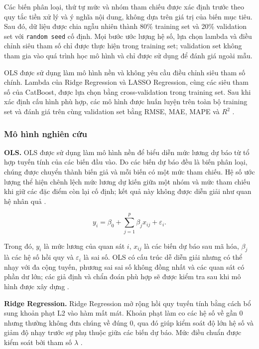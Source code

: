 Các biến phân loại, thứ tự mức và nhóm tham chiếu được xác định trước
theo quy tắc tiền xử lý và ý nghĩa nội dung, không dựa trên giá trị của
biến mục tiêu. Sau đó, dữ liệu được chia ngẫu nhiên thành 80\% training
set và 20\% validation set với \texttt{random\ seed} cố định. Mọi bước
ước lượng hệ số, lựa chọn lambda và điều chỉnh siêu tham số chỉ được
thực hiện trong training set; validation set không tham gia vào quá
trình học mô hình và chỉ được sử dụng để đánh giá ngoài mẫu.

OLS được sử dụng làm mô hình nền và không yêu cầu điều chỉnh siêu tham
số chính. Lambda của Ridge Regression và LASSO Regression, cùng các siêu
tham số của CatBoost, được lựa chọn bằng cross-validation trong training
set. Sau khi xác định cấu hình phù hợp, các mô hình được huấn luyện trên
toàn bộ training set và đánh giá trên cùng validation set bằng RMSE,
MAE, MAPE và \(R^2\) \cite{james2021}.

\subsubsection{Mô hình nghiên
cứu}\label{nghi:muxf4-huxecnh-nghiuxean-cux1ee9u}

\textbf{OLS.} OLS được sử dụng làm mô hình nền để biểu diễn mức lương dự
báo từ tổ hợp tuyến tính của các biến đầu vào. Do các biến dự báo đều là
biến phân loại, chúng được chuyển thành biến giả và mỗi biến có một mức
tham chiếu. Hệ số ước lượng thể hiện chênh lệch mức lương dự kiến giữa
một nhóm và mức tham chiếu khi giữ các đặc điểm còn lại cố định; kết quả
này không được diễn giải như quan hệ nhân quả \cite{james2021}.

\[
y_i = \beta_0 + \sum_{j=1}^{p} \beta_j x_{ij} + \varepsilon_i.
\]

Trong đó, \(y_i\) là mức lương của quan sát \(i\), \(x_{ij}\) là các
biến dự báo sau mã hóa, \(\beta_j\) là các hệ số hồi quy và
\(\varepsilon_i\) là sai số. OLS có cấu trúc dễ diễn giải nhưng có thể
nhạy với đa cộng tuyến, phương sai sai số không đồng nhất và các quan
sát có phần dư lớn; các giả định và chẩn đoán phù hợp sẽ được kiểm tra
sau khi mô hình được xây dựng \cite{james2021}.

\textbf{Ridge Regression.} Ridge Regression mở rộng hồi quy tuyến tính
bằng cách bổ sung khoản phạt L2 vào hàm mất mát. Khoản phạt làm co các
hệ số về gần 0 nhưng thường không đưa chúng về đúng 0, qua đó giúp kiểm
soát độ lớn hệ số và giảm độ nhạy trước sự phụ thuộc giữa các biến dự
báo. Mức điều chuẩn được kiểm soát bởi tham số \(\lambda\)
\cite{james2021,hastie2009}.

